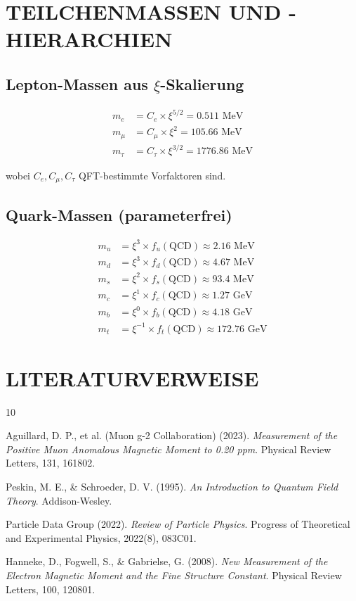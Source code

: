 	
	\section{TEILCHENMASSEN UND -HIERARCHIEN}
	
	\subsection{Lepton-Massen aus $\xi$-Skalierung}
	\begin{align}
		m_e &= C_e \times \xi^{5/2} = 0.511 \text{ MeV}\\
		m_\mu &= C_\mu \times \xi^{2} = 105.66 \text{ MeV}\\
		m_\tau &= C_\tau \times \xi^{3/2} = 1776.86 \text{ MeV}
	\end{align}
	
	wobei $C_e, C_\mu, C_\tau$ QFT-bestimmte Vorfaktoren sind.
	
	\subsection{Quark-Massen (parameterfrei)}
	\begin{align}
		m_u &= \xi^{3} \times f_u(\text{QCD}) \approx 2.16 \text{ MeV}\\
		m_d &= \xi^{3} \times f_d(\text{QCD}) \approx 4.67 \text{ MeV}\\
		m_s &= \xi^{2} \times f_s(\text{QCD}) \approx 93.4 \text{ MeV}\\
		m_c &= \xi^{1} \times f_c(\text{QCD}) \approx 1.27 \text{ GeV}\\
		m_b &= \xi^{0} \times f_b(\text{QCD}) \approx 4.18 \text{ GeV}\\
		m_t &= \xi^{-1} \times f_t(\text{QCD}) \approx 172.76 \text{ GeV}
	\end{align}
	
	\section{LITERATURVERWEISE}
	
	\begin{thebibliography}{10}
		
		Aguillard, D. P., et al. (Muon g-2 Collaboration) (2023). 
		\textit{Measurement of the Positive Muon Anomalous Magnetic Moment to 0.20 ppm}. 
		Physical Review Letters, 131, 161802.
		
		Peskin, M. E., \& Schroeder, D. V. (1995). 
		\textit{An Introduction to Quantum Field Theory}. 
		Addison-Wesley.
		
		Particle Data Group (2022). 
		\textit{Review of Particle Physics}. 
		Progress of Theoretical and Experimental Physics, 2022(8), 083C01.
		
		Hanneke, D., Fogwell, S., \& Gabrielse, G. (2008). 
		\textit{New Measurement of the Electron Magnetic Moment and the Fine Structure Constant}. 
		Physical Review Letters, 100, 120801.
		
	\end{thebibliography}
	